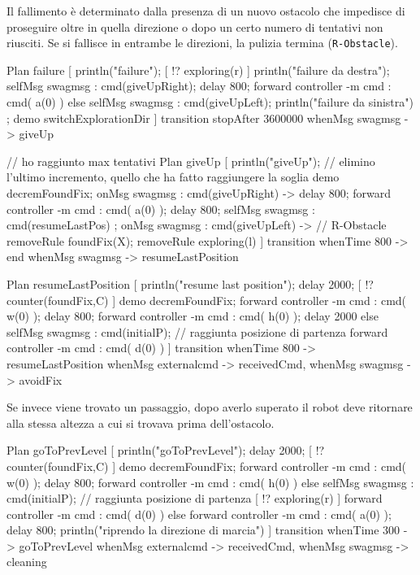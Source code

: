 \documentclass{../llncs}
\newcommand{\code}[1]{{\color{blue}\small{\texttt{#1}}}}
\begin{document}
Il fallimento è determinato dalla presenza di un nuovo ostacolo che impedisce di proseguire oltre in quella direzione o dopo un certo numero di tentativi non riusciti. Se si fallisce in entrambe le direzioni, la pulizia termina (\code{R-Obstacle}).\\

\begin{qacode}[caption={SoftwareAgent, pt8}]
Plan failure [
	println("failure");
	[ !? exploring(r) ] {
		println("failure da destra");
		selfMsg swagmsg : cmd(giveUpRight);
		delay 800;
		forward controller -m cmd : cmd( a(0) )
	}
	else {
		selfMsg swagmsg : cmd(giveUpLeft);
		println("failure da sinistra")
	};
	demo switchExplorationDir
]
transition stopAfter 3600000
	whenMsg swagmsg -> giveUp

// ho raggiunto max tentativi
Plan giveUp [
	println("giveUp");
	// elimino l'ultimo incremento, quello che ha fatto raggiungere la soglia
	demo decremFoundFix;
	onMsg swagmsg : cmd(giveUpRight) -> {
		delay 800;
		forward controller -m cmd : cmd( a(0) );
		delay 800;
		selfMsg swagmsg : cmd(resumeLastPos)
	};
	onMsg swagmsg : cmd(giveUpLeft) -> { // R-Obstacle
		removeRule foundFix(X);
		removeRule exploring(l)
	}
]
transition
	whenTime 800 -> end
	whenMsg swagmsg -> resumeLastPosition
	
Plan resumeLastPosition [
	println("resume last position");
	delay 2000;
	[ !? counter(foundFix,C) ] {
		demo decremFoundFix;
		forward controller -m cmd : cmd( w(0) );
		delay 800;
		forward controller -m cmd : cmd( h(0) );
		delay 2000
	}
	else {
		selfMsg swagmsg : cmd(initialP); // raggiunta posizione di partenza
		forward controller -m cmd : cmd( d(0) )
	}
]
transition
	whenTime 800 -> resumeLastPosition
	whenMsg externalcmd -> receivedCmd,
	whenMsg swagmsg -> avoidFix
\end{qacode}

Se invece viene trovato un passaggio, dopo averlo superato il robot deve ritornare alla stessa altezza a cui si trovava prima dell'ostacolo.\\

\begin{qacode}[caption={SoftwareAgent, pt9}]
Plan goToPrevLevel [
	println("goToPrevLevel");
	delay 2000;
	[ !? counter(foundFix,C) ] {
		demo decremFoundFix;
		forward controller -m cmd : cmd( w(0) );
		delay 800;
		forward controller -m cmd : cmd( h(0) )
	}
	else {
		selfMsg swagmsg : cmd(initialP); // raggiunta posizione di partenza
		[ !? exploring(r) ] forward controller -m cmd : cmd( d(0) )
		else forward controller -m cmd : cmd( a(0) );
		delay 800;
		println("riprendo la direzione di marcia")
	}
]
transition
	whenTime 300 -> goToPrevLevel
	whenMsg externalcmd -> receivedCmd,
	whenMsg swagmsg -> cleaning
\end{qacode}
\end{document}
